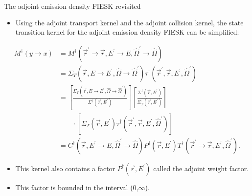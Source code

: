 \documentclass{beamer}
\begin{document}
\begin{frame}{The adjoint emission density FIESK revisited}
  
  \begin{itemize}
    \item Using the adjoint transport kernel and the adjoint collision kernel,
      the state transition kernel for the adjoint emission density FIESK 
      can be simplified:
  \end{itemize}

  \begin{align}
    M^{\dagger}(y \to x) & = M^{\dagger}(\vec{r}^{'} \to \vec{r},E^{'} \to E,
    \hat{\Omega}^{'} \to \hat{\Omega}) \nonumber \\
    & = \Sigma_T(\vec{r},E \to E^{'},\hat{\Omega} \to \hat{\Omega}^{'})
    \tau^{\dagger}(\vec{r}^{'},\vec{r},E^{'},\hat{\Omega}^{'}) \nonumber \\
    & = \left[
      \frac{\Sigma_T(\vec{r},E \to E^{'},\hat{\Omega} \to \hat{\Omega}^{'})}
           {\Sigma^{\dagger}(\vec{r},E^{'})}\right]
    \left[\frac{\Sigma^{\dagger}(\vec{r},E^{'})}{\Sigma_T(\vec{r},E^{'})}\right]
    \nonumber \\
    & \qquad \cdot \left[\Sigma_T(\vec{r},E^{'})
    \tau^{\dagger}(\vec{r}^{'},\vec{r},E^{'},\hat{\Omega}^{'})\right] \nonumber \\
    & = C^{\dagger}(\vec{r},E^{'} \to E,\hat{\Omega}^{'} \to \hat{\Omega})
    P^{\dagger}(\vec{r},E^{'})
    T^{\dagger}(\vec{r}^{'} \to \vec{r},E^{'},\hat{\Omega}^{'}). \nonumber
  \end{align}

  \begin{itemize}
    \item This kernel also contains a factor $P^{\dagger}(\vec{r},E^{'})$ called 
      the adjoint weight factor.
    \item This factor is bounded in the interval (0,$\infty$).
  \end{itemize}

\end{frame}
\end{document}
